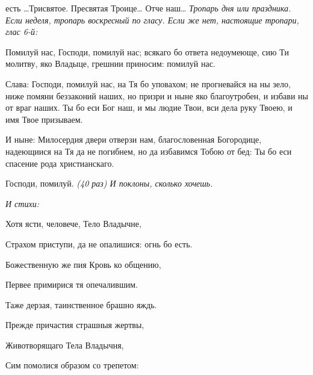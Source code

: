 есть …Трисвятое. Пресвятая Троице… Отче наш… \itshape Тропарь дня или праздника.\normalfont{} \itshape Если неделя, тропарь воскресный по гласу. Если же нет, настоящие тропари, глас 6-й:\normalfont{}


Помилуй нас, Господи, помилуй нас; всякаго бо ответа недоумеюще, сию Ти молитву, яко Владыце, грешнии приносим: помилуй нас.


Слава: Господи, помилуй нас, на Тя бо уповахом; не прогневайся на ны зело, ниже помяни беззаконий наших, но призри и ныне яко благоутробен, и избави ны от враг наших. Ты бо еси Бог наш, и мы людие Твои, вси дела руку Твоею, и имя Твое призываем.


И ныне: Милосердия двери отверзи нам, благословенная Богородице, надеющиися на Тя да не погибнем, но да избавимся Тобою от бед: Ты бо еси спасение рода христианскаго.


Господи, помилуй. \itshape (40 раз)\normalfont{} \itshape И поклоны, сколько хочешь.


\normalfont{}


\itshape И стихи:\normalfont{}


Хотя ясти, человече, Тело Владычне,


Страхом приступи, да не опалишися: огнь бо есть.


Божественную же пия Кровь ко общению,


Первее примирися тя опечалившим.


Таже дерзая, таинственное брашно яждь.


Прежде причастия страшныя жертвы,


Животворящаго Тела Владычня,


Сим помолися образом со трепетом:





